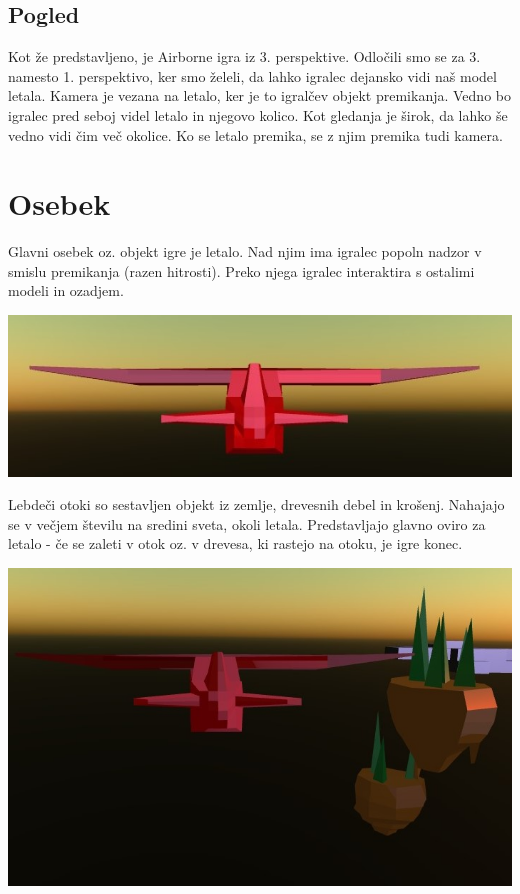 \documentclass[a4paper]{article}
\begin{document}
\subsection{Pogled}%
Kot že predstavljeno, je Airborne igra iz 3. perspektive. Odločili smo se za 3. namesto 1. perspektivo, ker smo želeli, da lahko igralec dejansko vidi naš model letala. Kamera je vezana na letalo, ker je to igralčev objekt premikanja. Vedno bo igralec pred seboj videl letalo in njegovo kolico. Kot gledanja je širok, da lahko še vedno vidi čim več okolice. Ko se letalo premika, se z njim premika tudi kamera.

\section{Osebek}%
Glavni osebek oz. objekt igre je letalo. Nad njim ima igralec popoln nadzor v smislu premikanja (razen hitrosti). Preko njega igralec interaktira s ostalimi modeli in ozadjem. 
\begin{center}
     \includegraphics[width=\columnwidth]{letalo.jpg}
\end{center}

Lebdeči otoki so sestavljen objekt iz zemlje, drevesnih debel in krošenj. Nahajajo se v večjem številu na sredini sveta, okoli letala. Predstavljajo glavno oviro za letalo - če se zaleti v otok oz. v drevesa, ki rastejo na otoku, je igre konec. 
\begin{center}
     \includegraphics[width=\columnwidth]{Otoki1.jpg}
\end{center}
\end{document}
